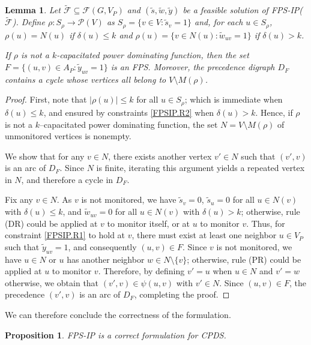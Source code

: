 \documentclass{article}
\newcommand{\PP}{{\mathcal P}}
\newcommand{\FF}{{\mathcal F}}
\newcommand{\FPSIP}{FPS-IP\xspace}
\newcommand{\FPSIPF}[1]{FPS-IP(#1)}
\newtheorem{proposition}{Proposition}
\newtheorem{lemma}{Lemma}
\begin{document}
\begin{lemma}\label{lemma.fps.constraint.generation}
Let $\tilde \FF \subseteq \FF(G,V_P)$ and $(\tilde s, \tilde w, \tilde y)$ be a feasible solution of \FPSIPF{$\tilde \FF$}.
Define $\rho: S_{\rho} \to \PP(V)$ as $S_{\rho} = \{v \in V: \tilde s_v = 1\}$ and, for each $u \in S_{\rho}$, $\rho(u) = N(u)$ if $\delta(u) \leq k$ and $\rho(u) = \{v \in N(u): \tilde w_{uv} = 1\}$ if $\delta(u) > k$.

If $\rho$ is not a $k$-capacitated power dominating function, then the set $F = \{(u,v) \in A_P: \tilde y_{uv} = 1\}$ is an FPS.
Moreover, the precedence digraph $D_F$ contains a  cycle whose vertices all belong to $V \setminus M(\rho)$. 
\end{lemma}
\begin{proof}
First, note that $|\rho(u)| \leq k$ for all $u \in S_{\rho}$; which is immediate when $\delta(u) \leq k$, and ensured by constraints \eqref{FPSIP.R2} when $\delta(u) > k$. 
Hence, if $\rho$ is not a $k$--capacitated power dominating function, the set $N = V \setminus M(\rho)$ of unmonitored vertices is nonempty.

We show that for any $v \in N$, there exists another vertex $v' \in N$ such that $(v',v)$ is an arc of $D_F$.
Since $N$ is finite, iterating this argument yields a repeated vertex in $N$, and therefore a  cycle in $D_F$.

Fix any $v \in N$.
As $v$ is not monitored, we have $\tilde s_v = 0$, $\tilde s_u = 0$ for all $u \in N(v)$ with $\delta(u) \leq k$, and $\tilde 
w_{uv} = 0$ for all $u \in N(v)$ with $\delta(u) > k$; otherwise, rule (DR) could be applied at $v$ to monitor itself, or at $u$ to monitor $v$.
Thus, for constraint \eqref{FPSIP.R1} to hold at $v$, there must exist at least one neighbor $u \in V_P$ such that $\tilde y_{uv} = 1$, and consequently $(u,v) \in F$.
Since $v$ is not monitored, we have $u \in N$ or $u$ has another neighbor $w \in N \setminus \{v\}$; otherwise, rule (PR) could be applied at $u$ to monitor $v$.
Therefore, by defining $v' = u$ when $u \in N$ and $v' = w$ otherwise, we obtain that $(v',v) \in \psi(u,v)$ with $v' \in N$.
Since $(u,v) \in F$, the precedence $(v',v)$ is an arc of $D_F$, completing the proof.
\end{proof}

We can therefore conclude the correctness of the formulation.
 
\begin{proposition}\label{prop.FPS.IP}
\FPSIP is a correct formulation for CPDS.
\end{proposition}
\end{document}
